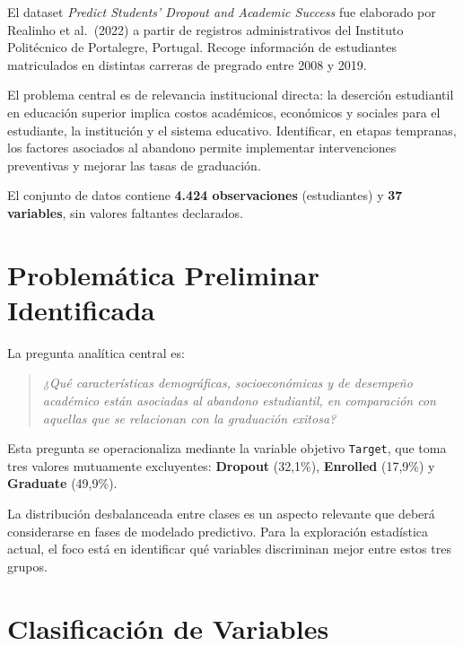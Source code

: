 \documentclass[11pt,a4paper]{article}
\begin{document}
El dataset \textit{Predict Students' Dropout and Academic Success} fue elaborado por
Realinho et al.\ (2022) a partir de registros administrativos del Instituto Politécnico de
Portalegre, Portugal. Recoge información de estudiantes matriculados en distintas carreras
de pregrado entre 2008 y 2019.

El problema central es de relevancia institucional directa: la deserción estudiantil en
educación superior implica costos académicos, económicos y sociales para el estudiante, la
institución y el sistema educativo. Identificar, en etapas tempranas, los factores asociados
al abandono permite implementar intervenciones preventivas y mejorar las tasas de
graduación.

El conjunto de datos contiene \textbf{4.424 observaciones} (estudiantes) y
\textbf{37 variables}, sin valores faltantes declarados.

\section{Problemática Preliminar Identificada}

La pregunta analítica central es:

\begin{quote}
  \textit{¿Qué características demográficas, socioeconómicas y de desempeño académico
  están asociadas al abandono estudiantil, en comparación con aquellas que se relacionan
  con la graduación exitosa?}
\end{quote}

Esta pregunta se operacionaliza mediante la variable objetivo \texttt{Target}, que toma tres
valores mutuamente excluyentes: \textcolor{rojodropout}{\textbf{Dropout}} (32,1\%),
\textcolor{azulenrolled}{\textbf{Enrolled}} (17,9\%) y
\textcolor{verdegraduate}{\textbf{Graduate}} (49,9\%).

La distribución desbalanceada entre clases es un aspecto relevante que deberá considerarse
en fases de modelado predictivo. Para la exploración estadística actual, el foco está en
identificar qué variables discriminan mejor entre estos tres grupos.

\section{Clasificación de Variables}
\end{document}
